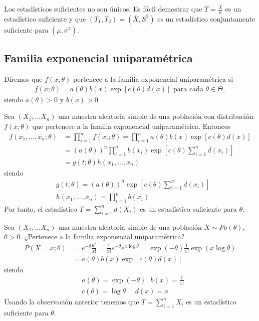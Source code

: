 \begin{obs}
Los estadísticos suficientes no son únicos. Es fácil demostrar que $T = \frac{\overline{X}}{n}$ es un estadístico suficiente y que $(T_1,T_2) = (\overline{X},  S^2)$ es un estadístico conjuntamente suficiente para $(\mu,\sigma^2)$.
\end{obs}

\subsection{Familia exponencial uniparamétrica}

\begin{defi}
Diremos que $f(x;\theta)$ pertenece a la familia exponencial uniparamétrica si
\begin{align*}
    f(x;\theta) = a(\theta)b(x)\exp[c(\theta)d(x)] \text{ para cada } \theta \in \Theta,
\end{align*}
siendo $a(\theta) > 0$ y $b(x) > 0$.
\end{defi}

\begin{obs}
Sea $(X_1,...X_n)$ una muestra aleatoria simple de una población con distribución $f(x;\theta)$ que pertenece a la familia exponencial uniparamétrica. Entonces
\begin{align*}
    f(x_1,...,x_n;\theta) &= \prod_{i=1}^{n}{f(x_i;\theta)} = \prod_{i=1}^{n}{a(\theta)b(x)\exp[c(\theta)d(x)]}\\
    &= (a(\theta))^n\prod_{i=1}^{n}{b(x_i)}\exp\left[c(\theta)\sum_{i=1}^{n}{d(x_i)} \right] \\
    &= g(t;\theta)h(x_1,...,x_n)
\end{align*}
siendo
\begin{align*}
    &g(t;\theta) =  (a(\theta))^n\exp\left[c(\theta)\sum_{i=1}^{n}{d(x_i)} \right] \\
    &h(x_1,...,x_n) = \prod_{i=1}^{n}{b(x_i)}
\end{align*}
Por tanto, el estadístico $T = \sum_{i=1}^{n}{d(X_i)}$ es un estadístico suficiente para $\theta$.
\end{obs}

\begin{ejemplo}
Sea $(X_1,...X_n)$ una muestra aleatoria simple de una población $X \sim Po(\theta)$, $\theta > 0$. ¿Pertenece a la familia exponencial uniparamétrica?
\begin{align*}
    P(X = x; \theta) &= e^{-\theta}\frac{\theta^x}{x!} = \frac{1}{x!}e^{-\theta}e^{x\log\theta} = \exp(-\theta)\frac{1}{x!}\exp(x\log\theta) \\
    &= a(\theta)b(x)\exp[c(\theta)d(x)]
\end{align*}
siendo
\begin{align*}
    &a(\theta) = \exp(-\theta) \ \ \ b(x) = \frac{1}{x!} \\
    &c(\theta) = \log\theta \ \ \ \ \ \ d(x) = x
\end{align*}
Usando la observación anterior tenemos que $T = \sum_{i=1}^{n}{X_i}$ es un estadístico suficiente para $\theta$.
\end{ejemplo}

